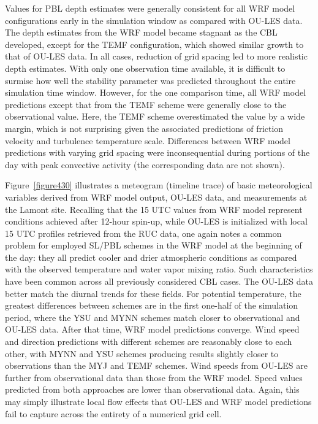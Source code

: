 Values for PBL depth estimates were generally consistent for all WRF model configurations early in the simulation window as compared with OU-LES data. The depth estimates from the WRF model became stagnant as the CBL developed, except for the TEMF configuration, which showed similar growth to that of OU-LES data. In all cases, reduction of grid spacing led to more realistic depth estimates. With only one observation time available, it is difficult to surmise how well the stability parameter was predicted throughout the entire simulation time window. However, for the one comparison time, all WRF model predictions except that from the TEMF scheme were generally close to the observational value. Here, the TEMF scheme overestimated the value by a wide margin, which is not surprising given the associated predictions of friction velocity and turbulence temperature scale. Differences between WRF model predictions with varying grid spacing were inconsequential during portions of the day with peak convective activity (the corresponding data are not shown). 

Figure~\ref{figure430} illustrates a meteogram (timeline trace) of basic meteorological variables derived from WRF model output, OU-LES data, and measurements at the Lamont site. Recalling that the 15 UTC values from WRF model represent conditions achieved after 12-hour spin-up, while OU-LES is initialized with local 15 UTC profiles retrieved from the RUC data, one again notes a common problem for employed SL\slash PBL schemes in the WRF model at the beginning of the day: they all predict cooler and drier atmospheric conditions as compared with the observed temperature and water vapor mixing ratio. Such characteristics have been common across all previously considered CBL cases. The OU-LES data better match the diurnal trends for these fields. For potential temperature, the greatest differences between schemes are in the first one-half of the simulation period, where the YSU and MYNN schemes match closer to observational and OU-LES data. After that time, WRF model predictions converge. Wind speed and direction predictions with different schemes are reasonably close to each other, with MYNN and YSU schemes producing results slightly closer to observations than the MYJ and TEMF schemes. Wind speeds from OU-LES are further from observational data than those from the WRF model. Speed values predicted from both approaches are lower than observational data. Again, this may simply illustrate local flow effects that OU-LES and WRF model predictions fail to capture across the entirety of a numerical grid cell.


